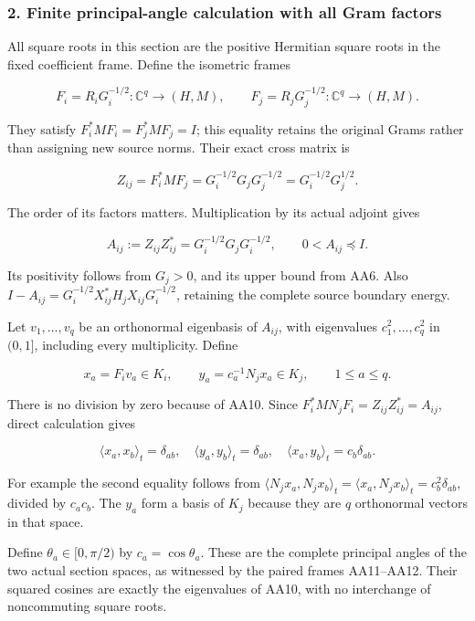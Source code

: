 \subsubsection{2. Finite principal-angle calculation with all Gram factors}\label{endpoint-all_degree_angle_review--finite-principal-angle-calculation-with-all-gram-factors}

All square roots in this section are the positive Hermitian square roots in the fixed coefficient frame. Define the isometric frames

\[
F_i=R_iG_i^{-1/2}:\mathbb C^q\to(H,M),\qquad
F_j=R_jG_j^{-1/2}:\mathbb C^q\to(H,M).
\tag{AA8}
\]

They satisfy \(F_i^*MF_i=F_j^*MF_j=I\); this equality retains the original Grams rather than assigning new source norms. Their exact cross matrix is

\[
Z_{ij}=F_i^*MF_j
=G_i^{-1/2}G_jG_j^{-1/2}
=G_i^{-1/2}G_j^{1/2}.
\tag{AA9}
\]

The order of its factors matters. Multiplication by its actual adjoint gives

\[
A_{ij}:=Z_{ij}Z_{ij}^*
=G_i^{-1/2}G_jG_i^{-1/2},
\qquad 0<A_{ij}\preceq I.
\tag{AA10}
\]

Its positivity follows from \(G_j>0\), and its upper bound from AA6. Also \(I-A_{ij}=G_i^{-1/2}X_{ij}^*H_jX_{ij}G_i^{-1/2}\), retaining the complete source boundary energy.

Let \(v_1,\ldots,v_q\) be an orthonormal eigenbasis of \(A_{ij}\), with eigenvalues \(c_1^2,\ldots,c_q^2\) in \((0,1]\), including every multiplicity. Define

\[
x_a=F_iv_a\in K_i,\qquad
y_a=c_a^{-1}N_jx_a\in K_j,
\qquad 1\le a\le q.
\tag{AA11}
\]

There is no division by zero because of AA10. Since \(F_i^*MN_jF_i=Z_{ij}Z_{ij}^*=A_{ij}\), direct calculation gives

\[
\langle x_a,x_b\rangle_t=\delta_{ab},\quad
\langle y_a,y_b\rangle_t=\delta_{ab},\quad
\langle x_a,y_b\rangle_t=c_b\delta_{ab}.
\tag{AA12}
\]

For example the second equality follows from \(\langle N_jx_a,N_jx_b\rangle_t
=\langle x_a,N_jx_b\rangle_t=c_b^2\delta_{ab}\), divided by \(c_ac_b\). The \(y_a\) form a basis of \(K_j\) because they are \(q\) orthonormal vectors in that space.

Define \(\theta_a\in[0,\pi/2)\) by \(c_a=\cos\theta_a\). These are the complete principal angles of the two actual section spaces, as witnessed by the paired frames AA11--AA12. Their squared cosines are exactly the eigenvalues of AA10, with no interchange of noncommuting square roots.

